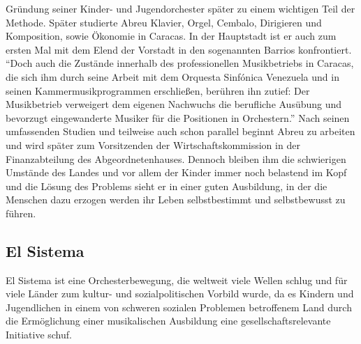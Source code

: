 Gründung seiner Kinder- und Jugendorchester später zu einem wichtigen Teil der
Methode. Später studierte Abreu Klavier, Orgel, Cembalo, Dirigieren und
Komposition, sowie Ökonomie in Caracas. In der Hauptstadt ist er auch zum ersten
Mal mit dem Elend der Vorstadt in den sogenannten Barrios konfrontiert.
\enquote{Doch auch die Zustände innerhalb des professionellen Musikbetriebs in
Caracas, die sich ihm durch seine Arbeit mit dem Orquesta Sinfónica Venezuela
und in seinen Kammermusikprogrammen erschließen, berühren ihn zutief: Der
Musikbetrieb verweigert dem eigenen Nachwuchs die berufliche Ausübung und
bevorzugt eingewanderte Musiker für die Positionen in
Orchestern.}\autocite[28]{kaufmann:el_sistema} Nach seinen umfassenden Studien
und teilweise auch schon parallel beginnt Abreu zu arbeiten und wird später zum
Vorsitzenden der Wirtschaftskommission in der Finanzabteilung des
Abgeordnetenhauses. Dennoch bleiben ihm die schwierigen Umstände des Landes und
vor allem der Kinder immer noch belastend im Kopf und die Lösung des Problems
sieht er in einer guten Ausbildung, in der die Menschen dazu erzogen werden ihr
Leben selbstbestimmt und selbstbewusst zu
führen.\autocite[31]{kaufmann:el_sistema} 



\subsection{El Sistema}
El Sistema ist eine Orchesterbewegung, die weltweit viele Wellen schlug und für
viele Länder zum kultur- und sozialpolitischen Vorbild wurde, da es Kindern und
Jugendlichen in einem von schweren sozialen Problemen betroffenem Land durch die
Ermöglichung einer musikalischen Ausbildung eine gesellschaftsrelevante
Initiative schuf. 

